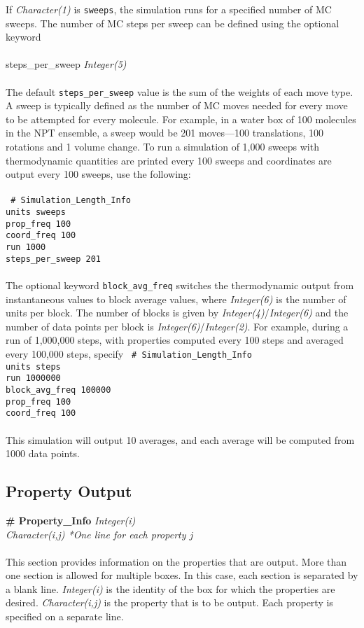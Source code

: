 %
If {\it Character(1)} is {\tt sweeps}, the simulation runs for a specified number of MC sweeps. 
The number of MC steps per sweep can be defined using the optional keyword \\ \\
%
steps\_per\_sweep {\it Integer(5)} \\ \\
%
The default \texttt{steps\_per\_sweep} value is the sum of the weights of each move type. 
A sweep is typically defined as the number of MC moves needed for every move to be attempted for every molecule.
For example, in a water box of 100 molecules in the NPT ensemble, a sweep would be 201 moves---100 translations,
100 rotations and 1 volume change.
To run a simulation of 1,000 sweeps with thermodynamic quantities are printed every 100 sweeps
and coordinates are output every 100 sweeps, use the following: \\ \\
%
\texttt{
\# Simulation\_Length\_Info \\
units             sweeps \\
prop\_freq        100 \\
coord\_freq       100 \\
run               1000 \\
steps\_per\_sweep 201 \\} \\
%
The optional keyword {\tt block\_avg\_freq} switches the thermodynamic output from instantaneous values
to block average values, where {\it Integer(6)} is the number of units per block.  
The number of blocks is given by {\it Integer(4)}/{\it Integer(6)} 
and the number of data points per block is {\it Integer(6)}/{\it Integer(2)}.
For example, during a run of 1,000,000 steps, with properties computed every 100 steps and 
averaged every 100,000 steps, specify
%
\texttt{
\# Simulation\_Length\_Info \\
units             steps \\
run               1000000 \\
block\_avg\_freq  100000 \\
prop\_freq        100 \\
coord\_freq       100 \\} \\
%
This simulation will output 10 averages, and each average will be computed from 1000 data points.
%
%
%
\subsection{Property Output}\label{sec:Property_Info}
{\bf \# Property\_Info} {\it Integer(i)} \\
{\it Character(i,j) *One line for each property $j$} \\ \\
%
This section provides information on the properties that are output. 
More than one section is allowed for multiple boxes. 
In this case, each section is separated by a blank line. 
{\it Integer(i)} is the identity of the box for which the properties are desired. 
{\it Character(i,j)} is the property that is to be output. 
Each property is specified on a separate line. 

